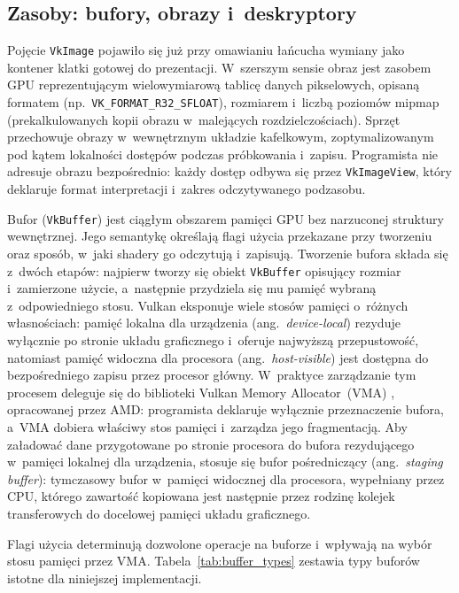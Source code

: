 \subsection{Zasoby: bufory, obrazy i~deskryptory}

Pojęcie \texttt{VkImage} pojawiło się już przy omawianiu łańcucha wymiany jako kontener
klatki gotowej do prezentacji. W~szerszym sensie obraz jest zasobem GPU reprezentującym
wielowymiarową tablicę danych pikselowych, opisaną formatem (np.\ \texttt{VK\_FORMAT\_R32\_SFLOAT}),
rozmiarem i~liczbą poziomów mipmap (prekalkulowanych kopii obrazu w~malejących rozdzielczościach). 
Sprzęt przechowuje obrazy w~wewnętrznym układzie
kafelkowym, zoptymalizowanym pod kątem lokalności dostępów podczas próbkowania i~zapisu.
Programista nie adresuje obrazu bezpośrednio: każdy dostęp odbywa się przez
\texttt{VkImageView}, który deklaruje format interpretacji i~zakres odczytywanego podzasobu.

Bufor (\texttt{VkBuffer}) jest ciągłym obszarem pamięci GPU bez narzuconej struktury
wewnętrznej. Jego semantykę określają flagi użycia przekazane przy tworzeniu oraz sposób,
w~jaki shadery go odczytują i~zapisują. Tworzenie bufora składa się z~dwóch etapów:
najpierw tworzy się obiekt \texttt{VkBuffer} opisujący rozmiar i~zamierzone użycie,
a~następnie przydziela się mu pamięć wybraną z~odpowiedniego stosu. Vulkan eksponuje
wiele stosów pamięci o~różnych własnościach: pamięć lokalna dla urządzenia
(ang.~\textit{device-local}) rezyduje wyłącznie po stronie układu graficznego
i~oferuje najwyższą przepustowość, natomiast pamięć widoczna dla procesora
(ang.~\textit{host-visible}) jest dostępna do bezpośredniego zapisu przez procesor główny.
W~praktyce zarządzanie tym procesem deleguje się do biblioteki Vulkan Memory Allocator~(VMA) \cite{vma-library},
opracowanej przez AMD: programista deklaruje wyłącznie przeznaczenie bufora,
a~VMA dobiera właściwy stos pamięci i~zarządza jego fragmentacją.
Aby załadować dane przygotowane po stronie procesora do bufora rezydującego w~pamięci
lokalnej dla urządzenia, stosuje się bufor pośredniczący (ang.~\textit{staging buffer}):
tymczasowy bufor w~pamięci widocznej dla procesora, wypełniany przez CPU, którego
zawartość kopiowana jest następnie przez rodzinę kolejek transferowych do docelowej
pamięci układu graficznego.

Flagi użycia determinują dozwolone operacje na buforze i~wpływają na wybór stosu pamięci
przez VMA. Tabela~\ref{tab:buffer_types} zestawia typy buforów istotne dla niniejszej
implementacji.

